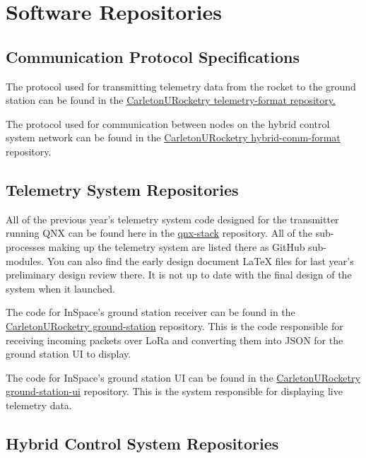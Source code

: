 \appendix

\section{Software Repositories} \label{apx:software-repos}

\subsection{Communication Protocol Specifications} \label{apx:comm-spec-repos}

The protocol used for transmitting telemetry data from the rocket to the ground station can be found in the
\href{https://github.com/CarletonURocketry/telemetry-format/blob/gh-pages/radio_packet_format.pdf}{CarletonURocketry
    telemetry-format repository.}

The protocol used for communication between nodes on the hybrid control system network can be found in the
\href{https://github.com/CarletonURocketry/hybrid-comm-format/blob/gh-pages/spec.pdf}{CarletonURocketry
    hybrid-comm-format} repository.

\subsection{Telemetry System Repositories} \label{apx:telem-repos}

All of the previous year's telemetry system code designed for the transmitter running QNX can be found here in the
\href{https://github.com/CarletonURocketry/qnx-stack}{qnx-stack} repository. All of the sub-processes making up the
telemetry system are listed there as GitHub sub-modules. You can also find the early design document LaTeX files for
last year's preliminary design review there. It is not up to date with the final design of the system when it launched.

The code for InSpace's ground station receiver can be found in the
\href{https://github.com/CarletonURocketry/ground-station}{CarletonURocketry ground-station} repository. This is the
code responsible for receiving incoming packets over LoRa and converting them into JSON for the ground station UI to
display.

The code for InSpace's ground station UI can be found in the
\href{https://github.com/CarletonURocketry/ground-station-ui}{CarletonURocketry ground-station-ui} repository. This is
the system responsible for displaying live telemetry data.

\subsection{Hybrid Control System Repositories} \label{apx:hybrid-control-repos}

